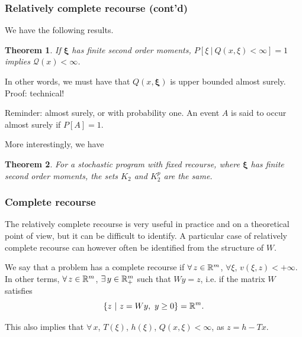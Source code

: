 \documentclass{beamer}
\newtheorem{theo}{Theorem}
\def\bxi{\boldsymbol\xi}
\def\bxi{\boldsymbol\xi}
\begin{document}
\begin{frame}
\frametitle{Relatively complete recourse (cont'd)}

We have the following results.

\begin{theo}
If $\bxi$ has finite second order moments, $P[ \xi \ |\ Q(x,\xi) < \infty] = 1$ implies $\mathcal{Q}(x) < \infty$.
\end{theo}

In other words, we must have that $Q(x,\bxi)$ is upper bounded almost surely. Proof: technical!

\mbox{}

Reminder: almost surely, or with probability one. An event $A$ is said to occur almost surely if $P[A] = 1$.

\mbox{}

More interestingly, we have
\begin{theo}
For a stochastic program with fixed recourse, where $\bxi$ has finite second order moments, the sets $K_2$ and $K_2^p$ are the same.
\end{theo}

\end{frame}

\begin{frame}
\frametitle{Complete recourse}

The relatively complete recourse is very useful in practice and on a theoretical point of view, but it can be difficult to identify.
A particular case of relatively complete recourse can however often be identified from the structure of $W$.

\mbox{}

We say that a problem has a {\red complete recourse} if $\forall\, z \in \mathbb{R}^m$, $\forall \xi$, $v(\xi, z) < +\infty$. In other terms, $\forall\, z \in \mathbb{R}^m$, $\exists\, y \in \mathbb{R}_+^m$ such that $Wy = z$, i.e. if the matrix $W$ satisfies
\[
\lbrace z \ |\ z=Wy,\ y \geq 0 \rbrace = \mathbb{R}^m.
\]

\mbox{}

This also implies that $\forall\, x$, $T(\xi)$, $h(\xi)$, $Q(x,\xi) < \infty$, as $z = h-Tx$.

\end{frame}
\end{document}
